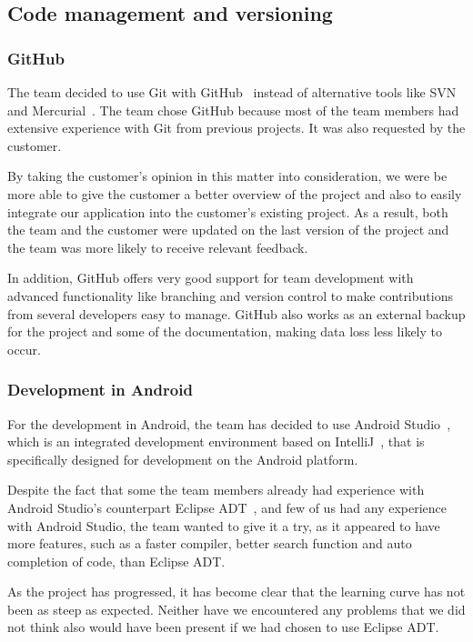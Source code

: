 \subsection{Code management and versioning}
\subsubsection{GitHub}
The team decided to use Git with GitHub~\cite{github} instead of alternative tools like SVN~\cite{svn} and Mercurial~\cite{mercurial}. 
The team chose GitHub because most of the team members had extensive experience with Git from previous projects. It was also requested by the customer. 

By taking the customer's opinion in this matter into consideration, we were be more able to give the customer a better overview of the project and also to easily integrate our application into the customer's existing project. As a result, both the team and the customer were updated on the last version of the project and the team was more likely to receive relevant feedback. 

In addition, GitHub offers very good support for team development 
with advanced functionality like branching and version control to make contributions from several developers easy 
to manage. GitHub also works as an external backup for the project and some of the documentation, making data loss less likely to occur.

\subsubsection{Development in Android}
For the development in Android, the team has decided to use Android Studio~\cite{Android-studio}, which is an integrated development environment based on IntelliJ~\cite{intellij}, that is specifically designed for development on the Android platform.

Despite the fact that some the team members already had experience with Android Studio's counterpart Eclipse ADT~\cite{eclipseadt}, and few of us had any experience with Android Studio, the team wanted to give it a try, as it appeared to have more features, such as a faster compiler, better search function and auto completion of code, than Eclipse ADT. 

As the project has progressed, it has become clear that the learning curve has not been as steep as expected. Neither have we encountered any problems that we did not think also would have been present if we had chosen to use Eclipse ADT.

